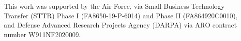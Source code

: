 \begin{acknowledgements}
This work was supported by the Air Force, via Small Business Technology Transfer (STTR) Phase I (FA8650-19-P-6014) and Phase II (FA864920C0010), and Defense Advanced Research Projects Agency (DARPA) via ARO contract number W911NF2020009.



\end{acknowledgements}





   








